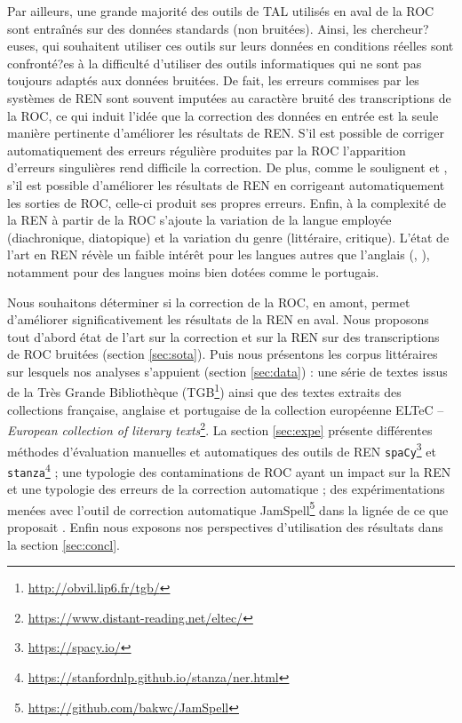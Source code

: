 Par ailleurs, une grande majorité des outils de TAL utilisés en aval de la ROC sont entraînés sur des données standards (non bruitées). Ainsi, les chercheur?euses, qui souhaitent utiliser ces outils sur leurs données en conditions réelles sont confronté?es à la difficulté d'utiliser des outils informatiques qui ne sont pas toujours adaptés aux données bruitées. De fait, les erreurs commises par les systèmes de REN sont souvent imputées au caractère bruité des transcriptions de la ROC, ce qui induit l'idée que la correction des données en entrée est la seule manière pertinente d'améliorer les résultats de REN. 
S'il est possible de corriger automatiquement des erreurs régulière produites par la ROC l'apparition d’erreurs singulières rend difficile la correction. De plus, comme le soulignent \cite{huynh:hal-03034484} et \cite{petkovic:hal-04063970}, s'il est possible d'améliorer les résultats de REN en corrigeant automatiquement les sorties de ROC, celle-ci produit ses propres erreurs. Enfin, à la complexité de la REN à partir de la ROC s'ajoute la variation de la langue employée (diachronique, diatopique) %
et la variation du genre (littéraire, critique). L'état de l'art en REN révèle un faible intérêt pour les langues autres que l’anglais (\cite{lejeune:hal-01294127}, \cite{rahimi-etal-2019-massively}), notamment pour des langues moins bien dotées comme le portugais.

Nous souhaitons déterminer si la correction de la ROC, en amont, permet d’améliorer  significativement les résultats de la REN en aval. Nous proposons tout d'abord état de l'art sur la correction et sur la REN sur des transcriptions de ROC bruitées (section \ref{sec:sota}). Puis nous présentons les corpus littéraires sur lesquels nos analyses s'appuient (section \ref{sec:data}) : une série de textes issus de la Très Grande Bibliothèque (TGB\footnote{\url{http://obvil.lip6.fr/tgb/}}) ainsi que des textes extraits des collections française, anglaise et portugaise de la collection européenne ELTeC -- \textit{European collection of literary texts}\footnote{\url{https://www.distant-reading.net/eltec/}}. La section \ref{sec:expe} présente différentes méthodes d'évaluation manuelles et automatiques des outils de REN \texttt{spaCy}\footnote{\url{https://spacy.io/}} \cite{ines_montani_2023_7715077} et \texttt{stanza}\footnote{\url{https://stanfordnlp.github.io/stanza/ner.html}} \cite{qi2020stanza}; une typologie des contaminations de ROC ayant un impact sur la REN et une typologie des erreurs de la correction automatique ; des expérimentations menées avec l’outil de correction automatique JamSpell\footnote{\url{https://github.com/bakwc/JamSpell}} dans la lignée de ce que proposait \cite{petkovic2022impact}. Enfin nous exposons nos perspectives d’utilisation des résultats dans la section \ref{sec:concl}.

